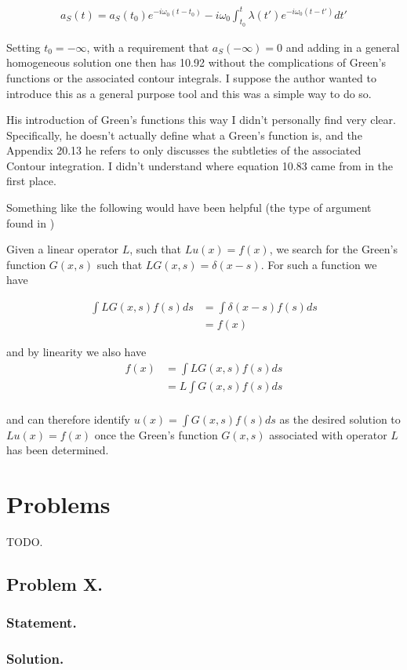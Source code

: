 \begin{align}\label{eqn:desaiCh10:5}
a_S(t) = a_S(t_0) e^{-i \omega_0 (t - t_0)} - i \omega_0 \int_{t_0}^t \lambda(t') e^{-i \omega_0 (t-t')} dt'
\end{align}

Setting $t_0 = -\infty$, with a requirement that $a_S(-\infty) = 0$ and adding in a general homogeneous solution one then has 10.92 without the complications of Green's functions or the associated contour integrals.  I suppose the author wanted to introduce this as a general purpose tool and this was a simple way to do so.

His introduction of Green's functions this way I didn't personally find very clear.  Specifically, he doesn't actually define what a Green's function is, and the Appendix 20.13 he refers to only discusses the subtleties of the associated Contour integration.  I didn't understand where equation 10.83 came from in the first place.

Something like the following would have been helpful (the type of argument found in \citep{wiki:greens})

Given a linear operator $L$, such that $L u(x) = f(x)$, we search for the Green's function $G(x,s)$ such that $L G(x,s) = \delta(x-s)$.  For such a function we have

\begin{align*}
\int L G(x,s) f(s) ds 
&= \int \delta(x-s) f(s) ds \\
&= f(x)
\end{align*}

and by linearity we also have
\begin{align*}
f(x) 
&=
\int L G(x,s) f(s) ds \\
&= L \int G(x,s) f(s) ds \\
\end{align*}

and can therefore identify $u(x) = \int G(x,s) f(s) ds$ as the desired solution to $L u(x) = f(x)$ once the Green's function $G(x,s)$ associated with operator $L$ has been determined.

\section{Problems}
TODO.
\subsection{Problem X.}
\subsubsection{Statement.}
\subsubsection{Solution.}

\EndArticle
